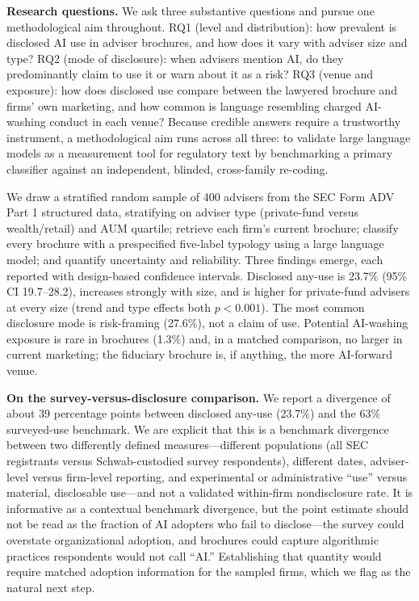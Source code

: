 \documentclass[utf8]{FrontiersinHarvard}
\begin{document}
\textbf{Research questions.} We ask three substantive questions and pursue one methodological aim throughout. RQ1 (level and distribution): how prevalent is disclosed AI use in adviser brochures, and how does it vary with adviser size and type? RQ2 (mode of disclosure): when advisers mention AI, do they predominantly claim to use it or warn about it as a risk? RQ3 (venue and exposure): how does disclosed use compare between the lawyered brochure and firms' own marketing, and how common is language resembling charged AI-washing conduct in each venue? Because credible answers require a trustworthy instrument, a methodological aim runs across all three: to validate large language models as a measurement tool for regulatory text by benchmarking a primary classifier against an independent, blinded, cross-family re-coding.

We draw a stratified random sample of 400 advisers from the SEC Form ADV Part 1 structured data, stratifying on adviser type (private-fund versus wealth/retail) and AUM quartile; retrieve each firm's current brochure; classify every brochure with a prespecified five-label typology using a large language model; and quantify uncertainty and reliability. Three findings emerge, each reported with design-based confidence intervals. Disclosed any-use is 23.7\% (95\% CI 19.7--28.2), increases strongly with size, and is higher for private-fund advisers at every size (trend and type effects both $p < 0.001$). The most common disclosure mode is risk-framing (27.6\%), not a claim of use. Potential AI-washing exposure is rare in brochures (1.3\%) and, in a matched comparison, no larger in current marketing; the fiduciary brochure is, if anything, the more AI-forward venue.

\textbf{On the survey-versus-disclosure comparison.} We report a divergence of about 39 percentage points between disclosed any-use (23.7\%) and the 63\% surveyed-use benchmark. We are explicit that this is a benchmark divergence between two differently defined measures---different populations (all SEC registrants versus Schwab-custodied survey respondents), different dates, adviser-level versus firm-level reporting, and experimental or administrative ``use'' versus material, disclosable use---and not a validated within-firm nondisclosure rate. It is informative as a contextual benchmark divergence, but the point estimate should not be read as the fraction of AI adopters who fail to disclose---the survey could overstate organizational adoption, and brochures could capture algorithmic practices respondents would not call ``AI.'' Establishing that quantity would require matched adoption information for the sampled firms, which we flag as the natural next step.
\end{document}
